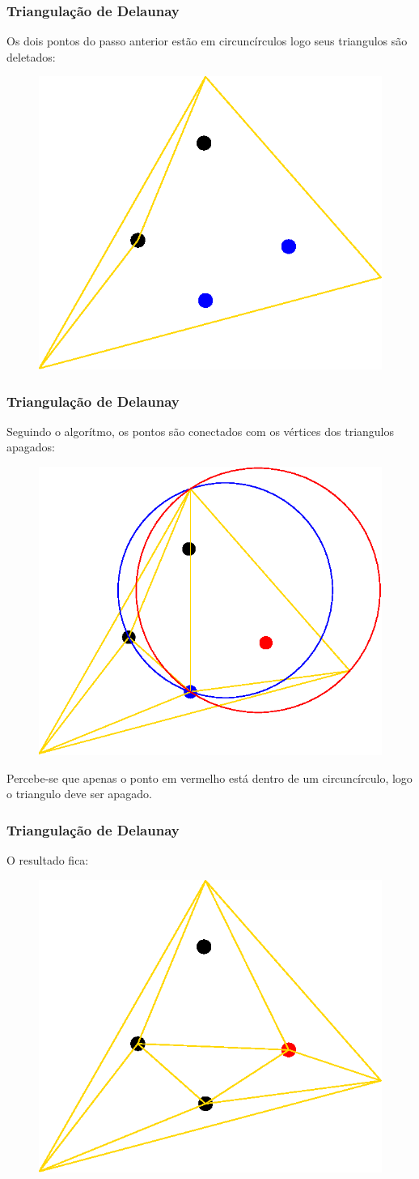 \documentclass{beamer}
\begin{document}
\begin{frame}
  \frametitle{Triangulação de Delaunay}

  Os dois pontos do passo anterior estão em circuncírculos logo seus triangulos são deletados:

  \begin{figure}
    \includegraphics[width=0.5\linewidth]{dela9.eps}
  \end{figure}
\end{frame}

\begin{frame}
  \frametitle{Triangulação de Delaunay}

  Seguindo o algorítmo, os pontos são conectados com os vértices dos triangulos apagados:

  \begin{figure}
    \includegraphics[width=0.5\linewidth]{dela10.eps}
  \end{figure}
  Percebe-se que apenas o ponto em vermelho está dentro de um circuncírculo, logo o triangulo deve ser apagado.
\end{frame}

\begin{frame}
  \frametitle{Triangulação de Delaunay}
  O resultado fica:

  \begin{figure}
    \includegraphics[width=0.5\linewidth]{dela11.eps}
  \end{figure}
\end{frame}
\end{document}
